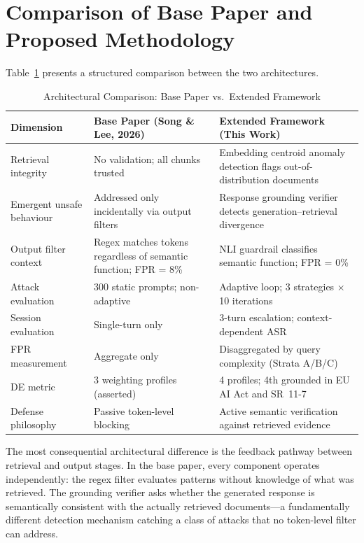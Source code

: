 \section{Comparison of Base Paper and Proposed Methodology}

Table~\ref{tab:comparison} presents a structured comparison between the two architectures.

\begin{table}[!t]
\centering
\caption{Architectural Comparison: Base Paper vs.\ Extended Framework}
\label{tab:comparison}
\begin{tabular}{p{3.6cm}p{5.5cm}p{5.5cm}}
\toprule
Dimension & Base Paper (Song \& Lee, 2026) & Extended Framework (This Work) \\
\midrule
Retrieval integrity & No validation; all chunks trusted & Embedding centroid anomaly detection flags out-of-distribution documents \\
\addlinespace
Emergent unsafe behaviour & Addressed only incidentally via output filters & Response grounding verifier detects generation--retrieval divergence \\
\addlinespace
Output filter context & Regex matches tokens regardless of semantic function; FPR = 8\% & NLI guardrail classifies semantic function; FPR = 0\% \\
\addlinespace
Attack evaluation & 300 static prompts; non-adaptive & Adaptive loop; 3 strategies $\times$ 10 iterations \\
\addlinespace
Session evaluation & Single-turn only & 3-turn escalation; context-dependent ASR \\
\addlinespace
FPR measurement & Aggregate only & Disaggregated by query complexity (Strata A/B/C) \\
\addlinespace
DE metric & 3 weighting profiles (asserted) & 4 profiles; 4th grounded in EU AI Act and SR~11-7 \\
\addlinespace
Defense philosophy & Passive token-level blocking & Active semantic verification against retrieved evidence \\
\bottomrule
\end{tabular}
\end{table}

The most consequential architectural difference is the feedback pathway between retrieval and output stages. In the base paper, every component operates independently: the regex filter evaluates patterns without knowledge of what was retrieved. The grounding verifier asks whether the generated response is semantically consistent with the actually retrieved documents---a fundamentally different detection mechanism catching a class of attacks that no token-level filter can address.

